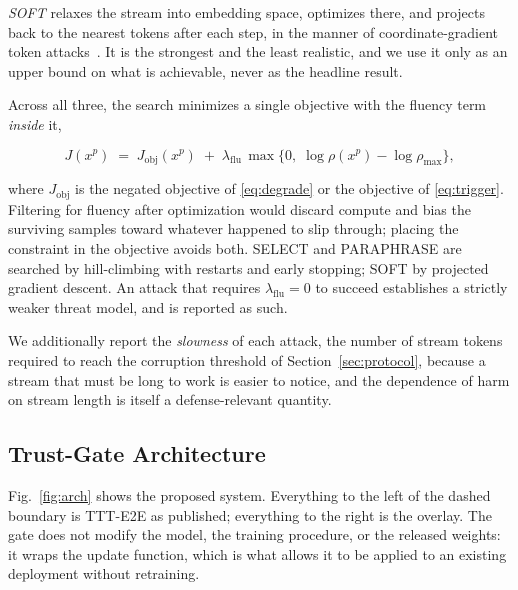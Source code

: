 \documentclass[journal]{IEEEtran}
\begin{document}
\emph{SOFT} relaxes the stream into embedding space, optimizes there, and projects
back to the nearest tokens after each step, in the manner of coordinate-gradient
token attacks~\cite{zou2023gcg}. It is the strongest and the least realistic, and we
use it only as an upper bound on what is achievable, never as the headline
result.

Across all three, the search minimizes a single objective with the fluency term
\emph{inside} it,

\begin{equation}
J(x^{p}) \;=\; J_{\mathrm{obj}}(x^{p})
\;+\; \lambda_{\mathrm{flu}}\,
\max\big\{0,\; \log \rho(x^{p}) - \log \rho_{\max}\big\},
\label{eq:attackobj}
\end{equation}

where $J_{\mathrm{obj}}$ is the negated objective of \eqref{eq:degrade} or the
objective of \eqref{eq:trigger}. Filtering for fluency after optimization would
discard compute and bias the surviving samples toward whatever happened to slip
through; placing the constraint in the objective avoids both. SELECT and PARAPHRASE
are searched by hill-climbing with restarts and early stopping; SOFT by projected
gradient descent. An attack that requires $\lambda_{\mathrm{flu}} = 0$ to succeed
establishes a strictly weaker threat model, and is reported as such.

We additionally report the \emph{slowness} of each attack, the number of stream
tokens required to reach the corruption threshold of Section~\ref{sec:protocol},
because a stream that must be long to work is easier to notice, and the dependence
of harm on stream length is itself a defense-relevant quantity.

\subsection{Trust-Gate Architecture}
\label{sec:arch}

Fig.~\ref{fig:arch} shows the proposed system. Everything to the left of the dashed
boundary is TTT-E2E as published; everything to the right is the overlay. The gate
does not modify the model, the training procedure, or the released weights: it wraps
the update function, which is what allows it to be applied to an existing deployment
without retraining.
\end{document}
